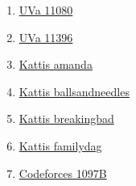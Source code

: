 \begin{enumerate}
\item \href{https://onlinejudge.org/index.php?option=com_onlinejudge&Itemid=8&page=show_problem&problem=2021}{UVa 11080}
\item \href{https://onlinejudge.org/index.php?option=com_onlinejudge&Itemid=8&page=show_problem&problem=2391}{UVa 11396}
\item \href{https://open.kattis.com/problems/amanda}{Kattis amanda}
\item \href{https://open.kattis.com/problems/ballsandneedles}{Kattis ballsandneedles}
\item \href{https://open.kattis.com/problems/breakingbad}{Kattis breakingbad}
\item \href{https://open.kattis.com/problems/familydag}{Kattis familydag}
\item \href{https://codeforces.com/problemset/problem/1097/B}{Codeforces 1097B}
\end{enumerate}
